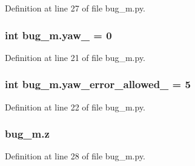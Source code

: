 Definition at line 27 of file bug\+\_\+m.\+py.

\subsubsection[{\texorpdfstring{yaw\+\_\+}{yaw_}}]{\setlength{\rightskip}{0pt plus 5cm}int bug\+\_\+m.\+yaw\+\_\+ = 0}\hypertarget{namespacebug__m_a8b5b5c9259592b8efd526c5adb95d95b}{}\label{namespacebug__m_a8b5b5c9259592b8efd526c5adb95d95b}


Definition at line 21 of file bug\+\_\+m.\+py.

\subsubsection[{\texorpdfstring{yaw\+\_\+error\+\_\+allowed\+\_\+}{yaw_error_allowed_}}]{\setlength{\rightskip}{0pt plus 5cm}int bug\+\_\+m.\+yaw\+\_\+error\+\_\+allowed\+\_\+ = 5}\hypertarget{namespacebug__m_a23e5e76f14d9d0d139767cb229a53dda}{}\label{namespacebug__m_a23e5e76f14d9d0d139767cb229a53dda}


Definition at line 22 of file bug\+\_\+m.\+py.

\subsubsection[{\texorpdfstring{z}{z}}]{\setlength{\rightskip}{0pt plus 5cm}bug\+\_\+m.\+z}\hypertarget{namespacebug__m_afbb54887da57b97920c8d36c6daed1fc}{}\label{namespacebug__m_afbb54887da57b97920c8d36c6daed1fc}


Definition at line 28 of file bug\+\_\+m.\+py.


